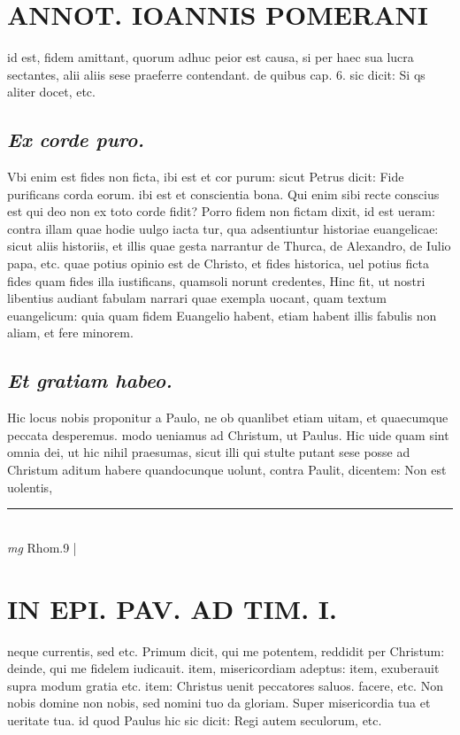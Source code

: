 \documentclass{article}
\begin{document}
\begin{pages}
\section*{ANNOT. IOANNIS POMERANI }\pstart id est, fidem amittant, quorum adhuc peior est causa, si per haec sua lucra sectantes, alii aliis sese praeferre contendant. de quibus cap. 6. sic dicit: Si qs aliter docet, etc.  \pend
{}
{}
\subsection*{\textit{Ex corde puro. }}\pstart Vbi enim est fides non ficta, ibi est et cor purum: sicut Petrus dicit: Fide purificans corda eorum. ibi est et conscientia bona. Qui enim sibi recte conscius est qui deo non ex toto corde fidit? Porro fidem non fictam dixit, id est ueram: contra illam quae hodie uulgo iacta tur, qua adsentiuntur historiae euangelicae: sicut aliis historiis, et illis quae gesta narrantur de Thurca, de Alexandro, de Iulio papa, etc. quae potius opinio est de Christo, et fides historica, uel potius ficta fides quam fides illa iustificans, quamsoli norunt credentes, Hinc fit, ut nostri libentius audiant fabulam narrari quae exempla uocant, quam textum euangelicum: quia quam fidem Euangelio habent, etiam habent illis fabulis non aliam, et fere minorem.  \pend
{}
{}
\subsection*{\textit{Et gratiam habeo. }}\pstart Hic locus nobis proponitur a Paulo, ne ob quanlibet etiam uitam, et quaecumque  peccata desperemus. modo ueniamus ad Christum, ut Paulus. Hic uide quam sint omnia dei, ut hic nihil praesumas, sicut illi qui stulte putant sese posse ad Christum aditum habere quandocunque  uolunt, contra Paulit, dicentem: Non est uolentis,  \pend
\vspace{0.5cm}\noindent
\vspace{0.2cm}\rule{1cm}{0.2pt}\\ 
\hspace{0.2cm}\textit{mg}
\footnotesize Rhom.9 
\normalsize| 
\section*{IN EPI. PAV. AD TIM. I. }
\marginpar{[ p.82 ]}\pstart neque  currentis, sed etc. Primum dicit, qui me potentem, reddidit per Christum: deinde, qui me fidelem iudicauit. item, misericordiam adeptus: item, exuberauit supra modum gratia etc. item: Christus uenit peccatores saluos. facere, etc. Non nobis domine non nobis, sed nomini tuo da gloriam. Super misericordia tua et ueritate tua. id quod Paulus hic sic dicit: Regi autem seculorum, etc.  \pend
{}
{}

\end{pages}
\end{document}

